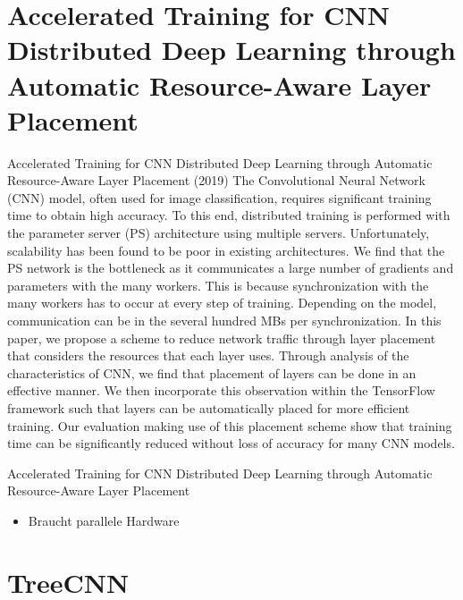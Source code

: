 \documentclass[10pt]{beamer}
\begin{document}
\section{Accelerated Training for CNN Distributed Deep Learning
through Automatic Resource-Aware Layer Placement}

\begin{frame}{Accelerated Training for CNN Distributed Deep Learning through Automatic Resource-Aware Layer Placement (2019)}
The Convolutional Neural Network (CNN) model, often used for image classification, requires significant training time to obtain high accuracy. To this end, distributed training is performed with the parameter server (PS) architecture using multiple servers. Unfortunately, scalability has been found to be poor in existing architectures. We find that the PS network is the bottleneck as it communicates a large number of gradients and parameters with the many workers. This is because synchronization with the many workers has to occur at every step of training. Depending on the model, communication can be in the several hundred MBs per synchronization. In this paper, we propose a scheme to reduce network traffic through layer placement that considers the resources that each layer uses. Through analysis of the characteristics of CNN, we find that placement of layers can be done in an effective manner. We then incorporate this observation within the TensorFlow framework such that layers can be automatically placed for more efficient training. Our evaluation making use of this placement scheme show that training time can be significantly reduced without loss of accuracy for many CNN models.
\end{frame}

\begin{frame}{Accelerated Training for CNN Distributed Deep Learning
through Automatic Resource-Aware Layer Placement}
\begin{itemize}
 \item Braucht parallele Hardware
\end{itemize}


\end{frame}

\section{TreeCNN}
\end{document}
